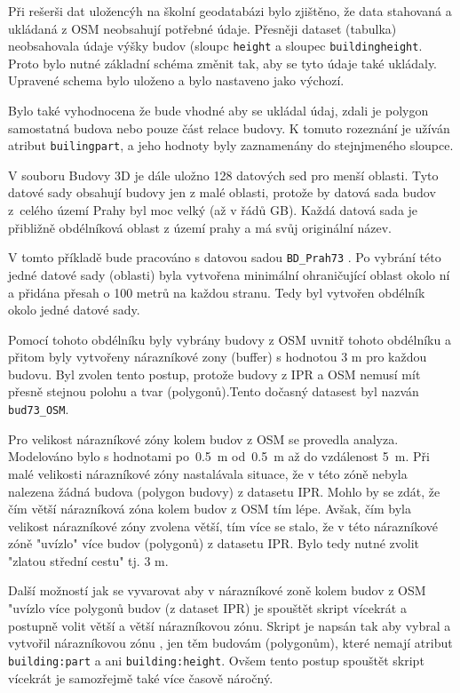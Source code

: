 Při rešerši dat uložencýh na školní geodatabázi bylo zjištěno,
že data stahovaná a ukládaná z OSM neobsahují potřebné údaje.
Přesněji dataset (tabulka) neobsahovala údaje výšky budov
(sloupc {\tt height} a sloupec {\tt building\:height}.
Proto bylo nutné základní schéma změnit tak, aby se tyto údaje také ukládaly.
Upravené schema bylo uloženo a bylo nastaveno jako výchozí.

Bylo také vyhodnocena že bude vhodné aby se ukládal údaj, zdali
je polygon samostatná budova nebo pouze část relace budovy.
K tomuto rozeznání je užíván atribut {\tt builing\:part},
a jeho hodnoty byly zaznamenány do stejnjmeného sloupce.


V souboru Budovy 3D je dále uložno 128 datových sed pro menší oblasti.
Tyto datové sady obsahují budovy jen z malé oblasti, protože by datová sada budov
z~celého území Prahy byl moc velký (až v řádů GB).
Každá datová sada je přibližně obdélníková oblast z území prahy
a má svůj originální název.

V tomto příkladě bude pracováno s datovou sadou {\tt BD\_Prah73} .
Po vybrání této jedné datové sady (oblasti) byla vytvořena minimální
ohraničující oblast okolo ní a přidána přesah o 100 metrů na každou stranu.
Tedy byl vytvořen obdélník okolo jedné datové sady.

Pomocí tohoto obdélníku byly vybrány budovy z OSM uvnitř tohoto obdélníku
a přitom byly vytvořeny nárazníkové zony (buffer) s hodnotou 3 m pro každou budovu.
Byl zvolen tento postup, protože budovy z IPR a OSM nemusí mít přesně stejnou
polohu a tvar (polygonů).Tento dočasný datasest byl nazván {\tt bud73\_OSM}.

Pro velikost nárazníkové zóny kolem budov z OSM se provedla analyza.
Modelováno bylo s hodnotami po~0.5~m od~0.5~m až do vzdálenost 5~m.
Při malé velikosti nárazníkové zóny nastalávala situace,
že v této zóně nebyla nalezena žádná budova (polygon budovy) z datasetu IPR.
Mohlo by se zdát, že čím větší nárazníková zóna kolem budov z OSM tím lépe.
Avšak, čím byla velikost nárazníkové zóny zvolena větší, tím více se stalo,
že v této nárazníkové zóně "uvízlo" více budov (polygonů) z datasetu IPR.
Bylo tedy nutné zvolit "zlatou střední cestu" tj. 3 m.

Další možností jak se vyvarovat aby v nárazníkové zoně kolem budov z OSM "uvízlo více
polygonů budov (z dataset IPR) je spouštět skript vícekrát a postupně volit větší
a větší nárazníkovou zónu. Skript je napsán tak aby vybral a vytvořil nárazníkovou zónu
, jen těm budovám (polygonům), které nemají atribut {\tt building:part} a ani
{\tt building:height}. Ovšem tento postup spouštět skript vícekrát je samozřejmě také
více časově náročný.

